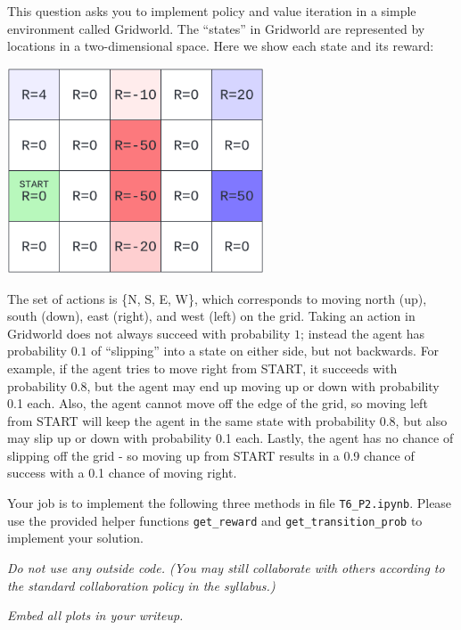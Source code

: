 \documentclass[submit]{harvardml}
\begin{document}
\begin{problem}

This question asks you to implement policy and value iteration in a
simple environment called Gridworld.  The ``states'' in Gridworld are
represented by locations in a two-dimensional space.  Here we show each state and its reward:

\begin{center}
\includegraphics[width=3in]{gridworld.png}
\end{center}
The set of actions is \{N, S, E, W\}, which corresponds to moving north (up), south (down), east (right), and west (left) on the grid.
Taking an action in Gridworld does not always succeed with probability
$1$; instead the agent has probability $0.1$ of ``slipping'' into a
state on either side, but not backwards.  For example, if the agent tries to move right from START, it succeeds with probability 0.8, but the agent may end up moving up or down with probability 0.1 each. Also, the agent cannot move off the edge of the grid, so moving left from START will keep the agent in the same state with probability 0.8, but also may slip up or down with probability 0.1 each. Lastly, the agent has no chance of slipping off the grid - so moving up from START results in a 0.9 chance of success with a 0.1 chance of moving right.

Your job is to implement the following three methods in file \texttt{T6\_P2.ipynb}. Please use the provided helper functions \texttt{get\_reward} and \texttt{get\_transition\_prob} to implement your solution.

\emph{Do not use any outside code.  (You may still collaborate with others according to the standard collaboration policy in the syllabus.)}  

\emph{Embed all plots in your writeup.}
\end{problem}
\newpage
\end{document}

